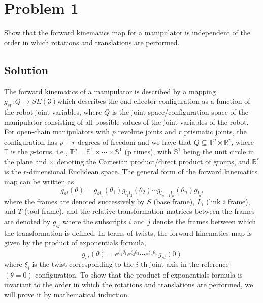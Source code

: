 \section*{Problem 1}
\setcounter{section}{1}
\setcounter{equation}{0}

Show that the forward kinematics map for a manipulator is independent of the order in which rotations and translations are performed.

\subsection*{Solution}

The forward kinematics of a manipulator is described by a mapping \( g_{st} : Q \to SE (3) \)which describes the end-eﬀector configuration as a function of the robot joint variables, where \( Q \) is the joint space/configuration space of the manipulator consisting of all possible values of the joint variables of the robot.
For open-chain manipulators with \( p \) revolute joints and \( r \) prismatic joints, the configuration has \( p+r \) degrees of freedom and we have that \( Q \subseteq \mathbb{T}^{p} \times \mathbb{R}^{r} \), where \( \mathbb{T} \) is the \(p\)-torus, i.e., \( \mathbb{T}^{p} = \mathbb{S}^{1} \times \cdots \times \mathbb{S}^{1} \) (p times), with \( \mathbb{S}^{1} \) being the unit circle in the plane and \( \times \) denoting the Cartesian product/direct product of groups, and \( \mathbb{R}^{r} \) is the \(r\)-dimensional Euclidean space.
The general form of the forward kinematics map can be written as
\begin{equation}
    g_{st}(\theta)
    =
    g_{s l_1}(\theta_1)
    g_{l_1 l_2}(\theta_2)
    \cdots
    g_{l_{n-1} l_n}(\theta_n)
    g_{l_n t}
\end{equation}
where the frames are denoted successively by \( S \) (base frame), \( L_i \) (link \(i\) frame), and \( T \) (tool frame), and the relative transformation matrices between the frames are denoted by \( g_{ij} \) where the subscripts \( i \) and \( j \) denote the frames between which the transformation is defined.
In terms of twists, the forward kinematics map is given by the product of exponentials formula,
\begin{equation}
    g_{st}(\theta)
    =
    e^{\widehat{\xi}_1 \theta_1}
    e^{\widehat{\xi}_2 \theta_2}
    \cdots
    e^{\widehat{\xi}_n \theta_n}
    g_{st}(0)
\end{equation}
where \( \xi_{i} \) is the twist corresponding to the \(i\)-th joint axis in the reference \( (\theta = 0) \) conﬁguration.
To show that the product of exponentials formula is invariant to the order in which the rotations and translations are performed, we will prove it by mathematical induction.

